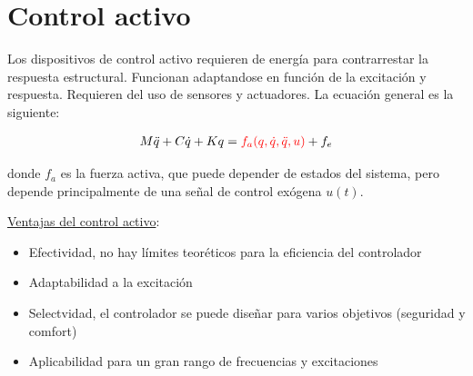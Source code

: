 

\section{Control activo}

Los dispositivos de control activo requieren de energía para contrarrestar la respuesta estructural. Funcionan adaptandose en función de la excitación y respuesta. Requieren del uso de sensores y actuadores. La ecuación general es la siguiente:

\begin{align}
    {M}{\ddot{q}} + {C}{\dot{q}} + {K}{q} = \textcolor{red}{{f}_a(q,\dot{q},\ddot{q},u)} + {f}_e
\end{align}

donde $f_a$ es la fuerza activa, que puede depender de estados del sistema, pero depende principalmente de una señal de control exógena $u(t)$.

\underline{Ventajas del control activo}:
\begin{itemize}
    \item Efectividad, no hay límites teoréticos para la eficiencia del controlador
    \item Adaptabilidad a la excitación
    \item Selectvidad, el controlador se puede diseñar para varios objetivos (seguridad y comfort)
    \item Aplicabilidad para un gran rango de frecuencias y excitaciones
\end{itemize}

